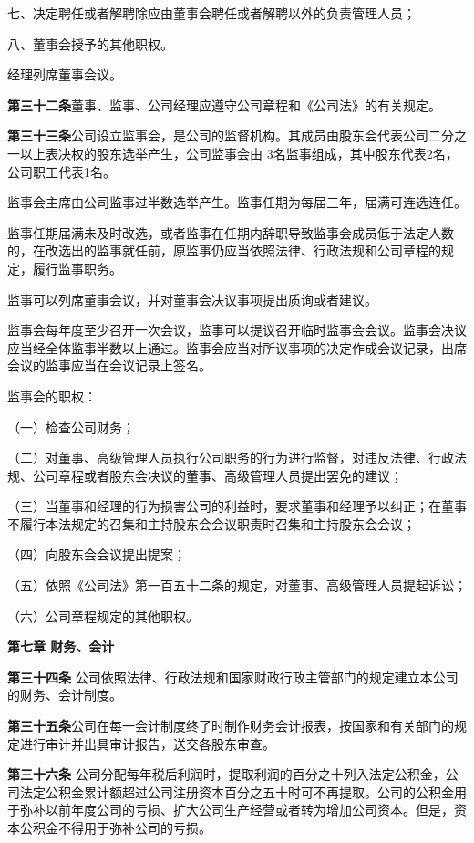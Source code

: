 七、决定聘任或者解聘除应由董事会聘任或者解聘以外的负责管理人员；

八、董事会授予的其他职权。

经理列席董事会议。

\textbf{第三十二条}\quad 董事、监事、公司经理应遵守公司章程和《公司法》的有关规定。

\textbf{第三十三条}\quad 公司设立监事会，是公司的监督机构。其成员由股东会代表公司二分之一以上表决权的股东选举产生，公司监事会由 3名监事组成，其中股东代表2名，公司职工代表1名。

监事会主席由公司监事过半数选举产生。监事任期为每届三年，届满可连选连任。

监事任期届满未及时改选，或者监事在任期内辞职导致监事会成员低于法定人数的，在改选出的监事就任前，原监事仍应当依照法律、行政法规和公司章程的规定，履行监事职务。

监事可以列席董事会议，并对董事会决议事项提出质询或者建议。

监事会每年度至少召开一次会议，监事可以提议召开临时监事会会议。监事会决议应当经全体监事半数以上通过。监事会应当对所议事项的决定作成会议记录，出席会议的监事应当在会议记录上签名。

    监事会的职权：

（一）检查公司财务；

（二）对董事、高级管理人员执行公司职务的行为进行监督，对违反法律、行政法规、公司章程或者股东会决议的董事、高级管理人员提出罢免的建议；

（三）当董事和经理的行为损害公司的利益时，要求董事和经理予以纠正；在董事不履行本法规定的召集和主持股东会会议职责时召集和主持股东会会议；

（四）向股东会会议提出提案；

（五）依照《公司法》第一百五十二条的规定，对董事、高级管理人员提起诉讼；

（六）公司章程规定的其他职权。


\begin{center}
\textbf{第七章 \quad  财务、会计}
\end{center}

\textbf{第三十四条} \quad 公司依照法律、行政法规和国家财政行政主管部门的规定建立本公司的财务、会计制度。

\textbf{第三十五条}\quad  公司在每一会计制度终了时制作财务会计报表，按国家和有关部门的规定进行审计并出具审计报告，送交各股东审查。

\textbf{第三十六条 } \quad 公司分配每年税后利润时，提取利润的百分之十列入法定公积金，公司法定公积金累计额超过公司注册资本百分之五十时可不再提取。公司的公积金用于弥补以前年度公司的亏损、扩大公司生产经营或者转为增加公司资本。但是，资本公积金不得用于弥补公司的亏损。

